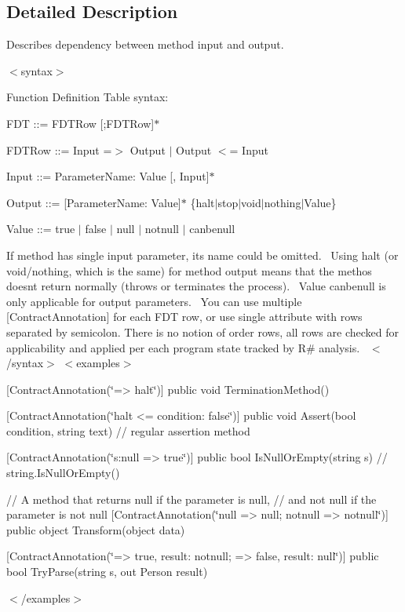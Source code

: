 \subsection{Detailed Description}
Describes dependency between method input and output. 

$<$syntax$>$ 

Function Definition Table syntax\+:


\begin{DoxyItemize}
\item F\+DT \+::= F\+D\+T\+Row \mbox{[};F\+D\+T\+Row\mbox{]}$\ast$ 
\item F\+D\+T\+Row \+::= Input =$>$ Output $\vert$ Output $<$= Input 
\item Input \+::= Parameter\+Name\+: Value \mbox{[}, Input\mbox{]}$\ast$ 
\item Output \+::= \mbox{[}Parameter\+Name\+: Value\mbox{]}$\ast$ \{halt$\vert$stop$\vert$void$\vert$nothing$\vert$\+Value\} 
\item Value \+::= true $\vert$ false $\vert$ null $\vert$ notnull $\vert$ canbenull 
\end{DoxyItemize}If method has single input parameter, it\textquotesingle{}s name could be omitted.~\newline
 Using {\ttfamily halt} (or {\ttfamily void}/{\ttfamily nothing}, which is the same) for method output means that the methos doesn\textquotesingle{}t return normally (throws or terminates the process).~\newline
 Value {\ttfamily canbenull} is only applicable for output parameters.~\newline
 You can use multiple {\ttfamily \mbox{[}Contract\+Annotation\mbox{]}} for each F\+DT row, or use single attribute with rows separated by semicolon. There is no notion of order rows, all rows are checked for applicability and applied per each program state tracked by R\# analysis.~\newline
 $<$/syntax$>$ $<$examples$>$
\begin{DoxyItemize}
\item {\ttfamily  \mbox{[}Contract\+Annotation(\char`\"{}=> halt\char`\"{})\mbox{]} public void Termination\+Method() } 
\item {\ttfamily  \mbox{[}Contract\+Annotation(\char`\"{}halt <= condition\+: false\char`\"{})\mbox{]} public void Assert(bool condition, string text) // regular assertion method } 
\item {\ttfamily  \mbox{[}Contract\+Annotation(\char`\"{}s\+:null => true\char`\"{})\mbox{]} public bool Is\+Null\+Or\+Empty(string s) // string.\+Is\+Null\+Or\+Empty() } 
\item {\ttfamily  // A method that returns null if the parameter is null, // and not null if the parameter is not null \mbox{[}Contract\+Annotation(\char`\"{}null => null; notnull => notnull\char`\"{})\mbox{]} public object Transform(object data) } 
\item {\ttfamily  \mbox{[}Contract\+Annotation(\char`\"{}=> true, result\+: notnull; => false, result\+: null\char`\"{})\mbox{]} public bool Try\+Parse(string s, out Person result) } 
\end{DoxyItemize}$<$/examples$>$ 

